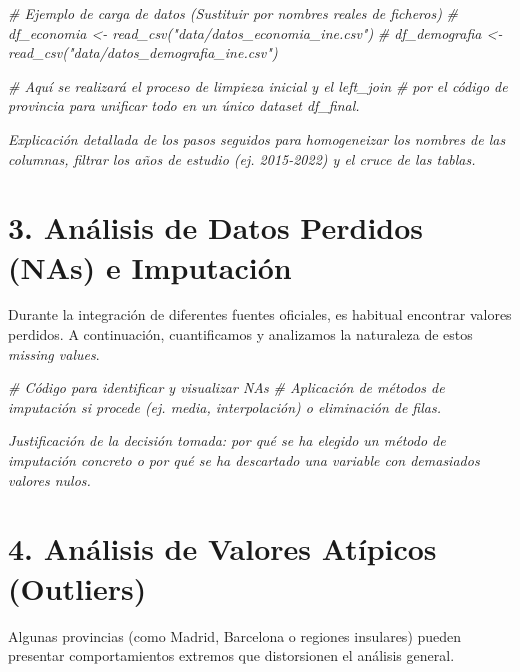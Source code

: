 \documentclass[data,article,submit,moreauthors,pdftex]{Definitions/mdpi}
\newenvironment{Shaded}{\begin{snugshade}}{\end{snugshade}}
\newcommand{\CommentTok}[1]{\textcolor[rgb]{0.56,0.35,0.01}{\textit{#1}}}
\begin{document}
\begin{Shaded}
\begin{Highlighting}[]
\CommentTok{\# Ejemplo de carga de datos (Sustituir por nombres reales de ficheros)}
\CommentTok{\# df\_economia \textless{}{-} read\_csv("data/datos\_economia\_ine.csv")}
\CommentTok{\# df\_demografia \textless{}{-} read\_csv("data/datos\_demografia\_ine.csv")}

\CommentTok{\# Aquí se realizará el proceso de limpieza inicial y el \textquotesingle{}left\_join\textquotesingle{} }
\CommentTok{\# por el código de provincia para unificar todo en un único dataset \textquotesingle{}df\_final\textquotesingle{}.}
\end{Highlighting}
\end{Shaded}

\emph{Explicación detallada de los pasos seguidos para homogeneizar los
nombres de las columnas, filtrar los años de estudio (ej. 2015-2022) y
el cruce de las tablas.}

\section{3. Análisis de Datos Perdidos (NAs) e
Imputación}\label{anuxe1lisis-de-datos-perdidos-nas-e-imputaciuxf3n}

Durante la integración de diferentes fuentes oficiales, es habitual
encontrar valores perdidos. A continuación, cuantificamos y analizamos
la naturaleza de estos \emph{missing values}.

\begin{Shaded}
\begin{Highlighting}[]
\CommentTok{\# Código para identificar y visualizar NAs}
\CommentTok{\# Aplicación de métodos de imputación si procede (ej. media, interpolación) o eliminación de filas.}
\end{Highlighting}
\end{Shaded}

\emph{Justificación de la decisión tomada: por qué se ha elegido un
método de imputación concreto o por qué se ha descartado una variable
con demasiados valores nulos.}

\section{4. Análisis de Valores Atípicos
(Outliers)}\label{anuxe1lisis-de-valores-atuxedpicos-outliers}

Algunas provincias (como Madrid, Barcelona o regiones insulares) pueden
presentar comportamientos extremos que distorsionen el análisis general.
\end{document}
